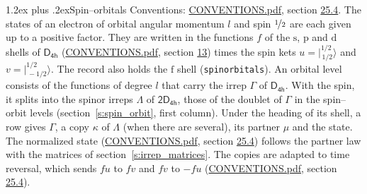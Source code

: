 \documentclass[10pt,a4paper]{article}
\makeatletter
\renewcommand\section{\@startsection{section}{1}{\z@}{-3ex plus -1ex minus -.2ex}%
  {1.2ex plus .2ex}{\normalfont\large\sffamily\bfseries\color{parttitle}}}
\numberwithin{equation}{section}
\newcommand{\grp}[1]{\mathsf{#1}}
\newcommand{\orbital}[1]{\mathrm{#1}}
\newcommand{\mult}{\kappa}
\newcommand{\intx}{\mu}
\newcommand{\jm}[2]{\bigl\lvert{}^{#1}_{\,#2}\bigr\rangle}
\makeatother
\begin{document}
\section{Spin--orbitals}\label{s:spin_orbitals}
Conventions: \href{../../CONVENTIONS.pdf}{CONVENTIONS.pdf}, section \href{../../CONVENTIONS.pdf\#conv.25.4}{25.4}.
\leavevmode\label{n:index.orbital.l}The states of an electron of orbital angular momentum $l$ and spin $\nicefrac{1}{2}$ are each given up to a positive factor. \label{n:local.spinor.uv}\label{n:local.function.f}They are written in the functions $f$ of the $\orbital{s}$, $\orbital{p}$ and $\orbital{d}$ shells of \href{../../../rotation/data/pdf/D4h.pdf}{$\grp{D_{4h}}$} (\href{../../CONVENTIONS.pdf}{CONVENTIONS.pdf}, section \href{../../../rotation/CONVENTIONS.pdf\#conv.13}{13}) times the spin kets $u = \jm{1/2}{1/2}$ and $v = \jm{1/2}{-1/2}$. The record also holds the $\orbital{f}$ shell (\texttt{spinorbitals}). An orbital level consists of the functions of degree $l$ that carry the irrep $\Gamma$ of \href{../../../rotation/data/pdf/D4h.pdf}{$\grp{D_{4h}}$}. With the spin, it splits into the spinor irreps $\Lambda$ of $\grp{2D_{4h}}$, those of the doublet of $\Gamma$ in the spin--orbit levels (section~\ref{s:spin_orbit}, first column). \label{n:head.state}Under the heading of its shell, a row gives $\Gamma$, a copy $\mult$ of $\Lambda$ (when there are several), its partner $\intx$ and the state. The normalized state (\href{../../CONVENTIONS.pdf}{CONVENTIONS.pdf}, section \href{../../CONVENTIONS.pdf\#conv.25.4}{25.4}) follows the partner law with the matrices of section~\ref{s:irrep_matrices}. The copies are adapted to time reversal, which sends $f u$ to $f v$ and $f v$ to $-f u$ (\href{../../CONVENTIONS.pdf}{CONVENTIONS.pdf}, section \href{../../CONVENTIONS.pdf\#conv.25.4}{25.4}).
\end{document}
